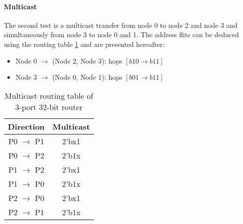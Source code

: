 \paragraph{Multicast}

The second test is a multicast transfer from node 0 to node 2 and node 3 and simultaneously from node 3 to node 0 and 1.
The address flits can be deduced using the routing table \ref{multicast_routing_table_3port_32bit_router} and are
presented hereafter:

\begin{itemize}
\item Node 0 $\rightarrow$ (Node 2, Node 3): hops $[b10 \rightarrow b11]$
\item Node 3 $\rightarrow$ (Node 0, Node 1): hops $[b01 \rightarrow b11]$
\end{itemize}

\begin{table}[h]
  \centering
  \begin{tabular}{c | c }
    \toprule
    \hline
    \textbf{Direction} & \textbf{Multicast} \\
    \hline\hline
    P0 $\rightarrow$ P1 & 2'bx1 \\
    \hline
    P0 $\rightarrow$ P2 & 2'b1x \\
    \hline
    P1 $\rightarrow$ P2 & 2'bx1 \\
    \hline
    P1 $\rightarrow$ P0 & 2'b1x \\
    \hline
    P2 $\rightarrow$ P0 & 2'bx1 \\
    \hline
    P2 $\rightarrow$ P1 & 2'b1x \\
    \hline
    \bottomrule
  \end{tabular}
  \caption{Multicast routing table of 3-port 32-bit router}
  \label{multicast_routing_table_3port_32bit_router}
\end{table}





